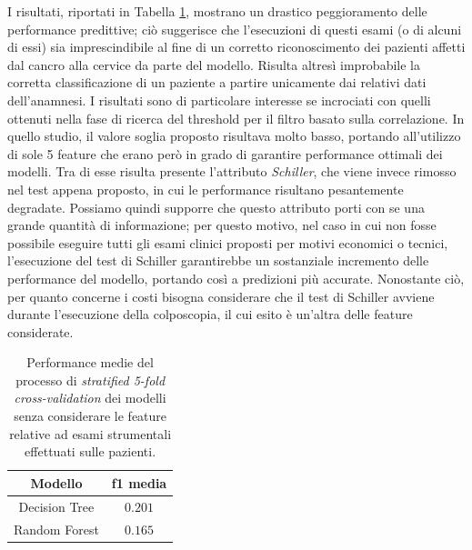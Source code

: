 I risultati, riportati in Tabella \ref{tab:noexamsscore}, mostrano un drastico peggioramento delle performance predittive; ciò suggerisce che l'esecuzioni di questi esami (o di alcuni di essi) sia imprescindibile al fine di un corretto riconoscimento dei pazienti affetti dal cancro alla cervice da parte del modello. 
Risulta altresì improbabile la corretta classificazione di un paziente a partire unicamente dai relativi dati dell'anamnesi.
I risultati sono di particolare interesse se incrociati con quelli ottenuti nella fase di ricerca del threshold per il filtro basato sulla correlazione. In quello studio, il valore soglia proposto risultava molto basso, portando all'utilizzo di sole 5 feature che erano però in grado di garantire performance ottimali dei modelli. Tra di esse risulta presente l'attributo \textit{Schiller}, che viene invece rimosso nel test appena proposto, in cui le performance risultano pesantemente degradate. Possiamo quindi supporre che questo attributo porti con se una grande quantità di informazione; per questo motivo, nel caso in cui non fosse possibile eseguire tutti gli esami clinici proposti per motivi economici o tecnici, l'esecuzione del test di Schiller garantirebbe un sostanziale incremento delle performance del modello, portando così a predizioni più accurate.
Nonostante ciò, per quanto concerne i costi bisogna considerare che il test di Schiller avviene durante l'esecuzione della colposcopia, il cui esito è un'altra delle feature considerate.
\begin{table}
	\centering
	\caption{Performance medie del processo di \textit{stratified 5-fold cross-validation} dei modelli senza considerare le feature relative ad esami strumentali effettuati sulle pazienti.}
	\label{tab:noexamsscore}
	\begin{tabular}{|c|c|}
		\toprule
		Modello & f1 media \\ 
		\midrule 
		Decision Tree & $0.201$ \\
		Random Forest & $0.165$ \\ 
		\bottomrule
	\end{tabular}
\end{table}